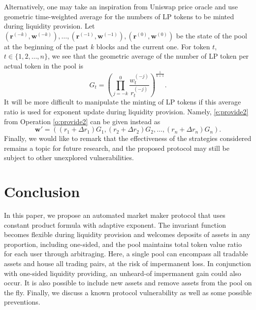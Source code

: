 \documentclass[12pt,a4paper]{article}
\begin{document}
Alternatively, one may take an inspiration from Uniswap price oracle \cite{AZR,AZSKR} and use geometric time-weighted average for the numbers of LP tokens to be minted during liquidity provision. Let $\left(\mathbf{r}^{(-k)},\mathbf{w}^{(-k)}\right),\ldots,\left(\mathbf{r}^{(-1)},\mathbf{w}^{(-1)}\right),\left(\mathbf{r}^{(0)},\mathbf{w}^{(0)}\right)$ be the state of the pool at the beginning of the past $k$ blocks and the current one. For token $t$, $t\in\{1,2,\ldots,n\}$, we see that the geometric average of the number of LP token per actual token in the pool is
\[G_t=\left(\prod_{j=-k}^0\frac{w_t^{(-j)}}{r_t^{(-j)}}\right)^\frac{1}{k+1}.\]
It will be more difficult to manipulate the minting of LP tokens if this average ratio is used  for exponent update during liquidity provision. Namely, \eqref{e:provide2} from Operation \ref{o:provide2} can be given instead as
\[\mathbf{w'}=((r_1+\Delta r_1)G_1,(r_2+\Delta r_2)G_2,\ldots,(r_n+\Delta r_n)G_n).\]
Finally, we would like to remark that the effectiveness of the strategies considered remains a topic for future research, and the proposed protocol may still be subject to other unexplored vulnerabilities.


\section{Conclusion}

In this paper, we propose an automated market maker protocol that uses constant product formula with adaptive exponent. The invariant function becomes flexible during liquidity provision and welcomes deposits of assets in any proportion, including one-sided, and the pool maintains total token value ratio for each user through arbitraging. Here, a single pool can encompass all tradable assets and house all trading pairs, at the risk of impermanent loss. In conjunction with one-sided liquidity providing, an unheard-of impermanent gain could also occur. It is also possible to include new assets and remove assets from the pool on the fly. Finally, we discuss a known protocol vulnerability as well as some possible preventions.
\end{document}
